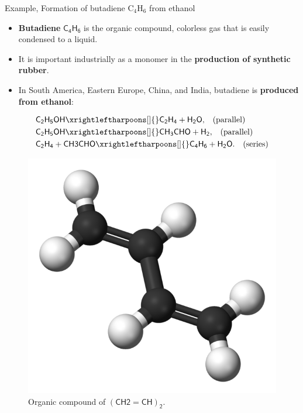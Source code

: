 \begin{frame}[<+->]{Example, Formation of butadiene C$_4$H$_6$ from ethanol}
	\begin{itemize}
		\item \alert{\bf Butadiene} $\mathsf{C_4H_6}$ is the organic compound, colorless gas that is easily condensed to a liquid.
		\item It is important industrially as a monomer in the \alert{\bf production of synthetic rubber}. 
		\item In South America, Eastern Europe, China, and India, butadiene is {\bf produced from ethanol}:		
	\end{itemize}
	\lcol
	\begin{alignat*}{2}
		& \mathsf{C_2H_5OH \xrightleftharpoons[]{} C_2H_4 + H_2O,} \quad \mbox{(parallel)}\\
		& \mathsf{C_2H_5OH \xrightleftharpoons[]{} CH_3CHO + H_2,}  \quad \mbox{(parallel)}\\
		& \mathsf{C_2H_4 + CH3CHO \xrightleftharpoons[]{}  C_4H_6 + H_2O.}  \quad \mbox{(series)}
	\end{alignat*}
	\rcol
	\begin{figure}[!t]
		\includegraphics[scale=0.15]{figures/chemical-kinetics/butadiene.png}
		\caption{Organic compound of $\mathsf{(CH2=CH)_2}$.}
	\end{figure}
	\ecol
\end{frame}
